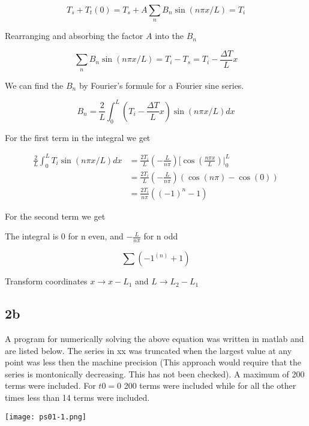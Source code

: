 \documentclass{article}
\begin{document}
\begin{equation}
T_s + T_t(0) = T_s + A\sum_n B_n \sin(n\pi x/L) = T_i
\end{equation}

Rearranging and absorbing the factor $A$ into the $B_n$

\begin{equation}
\sum_n B_n \sin(n\pi x/L) = T_i -T_s = T_i - \frac{\Delta T}{L}x
\end{equation}

We can find the $B_n$ by Fourier's formule for a Fourier sine series.

\begin{equation}
B_n = \frac{2}{L} \int_0^L (T_i-\frac{\Delta T}{L}x) \sin(n\pi x /L) dx 
\end{equation}

For the first term in the integral we get

\begin{align}
\frac{2}{L} \int_0^L T_i \sin(n\pi x /L) dx  &= \frac{2 T_i}{L} (-\frac{L}{n\pi})[\cos(\frac{n\pi x}{L}) |_0^L \\ 
&= \frac{2 T_i}{L} (-\frac{L}{n\pi}) (\cos(n\pi) - \cos(0)) \\
&= \frac{2 T_i}{n\pi}((-1)^n - 1)
\end{align}

For the second term we get

The integral is 0 for n even, and $-\frac{L}{n\pi}$ for n odd

\begin{equation}
	\sum (-1^(n)+1)
\end{equation}




Transform coordinates $x \rightarrow x - L_1$ and $L \rightarrow L_2 - L_1$ 

\subsection{2b}

A program for numerically solving the above equation was written in matlab and are listed below. The series in xx was truncated when the largest value at any point was less then the machine precision (This approach would require that the series is montonically decreasing. This has not been checked). A maximum of 200 terms were included. For $t0=0$ 200 terms were included while for all the other times less than 14 terms were included.




\texttt{[image: ps01-1.png]}
\end{document}
